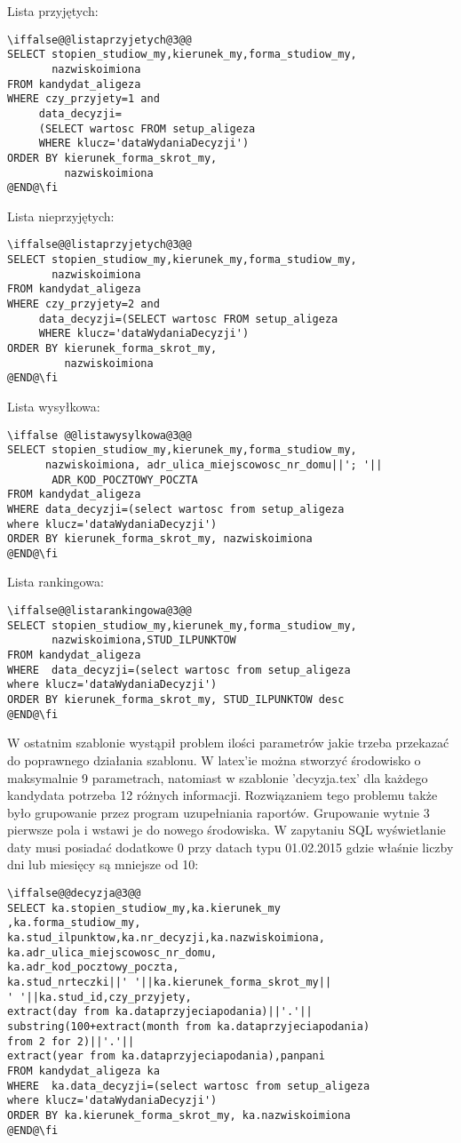 \par Lista przyjętych:
 \begin{verbatim}
\iffalse@@listaprzyjetych@3@@
SELECT stopien_studiow_my,kierunek_my,forma_studiow_my,
       nazwiskoimiona 
FROM kandydat_aligeza 
WHERE czy_przyjety=1 and
     data_decyzji=
     (SELECT wartosc FROM setup_aligeza 
     WHERE klucz='dataWydaniaDecyzji')
ORDER BY kierunek_forma_skrot_my,
         nazwiskoimiona
@END@\fi
\end{verbatim}
\par Lista nieprzyjętych:
 \begin{verbatim}
\iffalse@@listaprzyjetych@3@@
SELECT stopien_studiow_my,kierunek_my,forma_studiow_my,
       nazwiskoimiona 
FROM kandydat_aligeza 
WHERE czy_przyjety=2 and
     data_decyzji=(SELECT wartosc FROM setup_aligeza 
     WHERE klucz='dataWydaniaDecyzji')
ORDER BY kierunek_forma_skrot_my,
         nazwiskoimiona
@END@\fi
\end{verbatim}
\par Lista wysyłkowa:
 \begin{verbatim}
\iffalse @@listawysylkowa@3@@
SELECT stopien_studiow_my,kierunek_my,forma_studiow_my,
      nazwiskoimiona, adr_ulica_miejscowosc_nr_domu||'; '||
       ADR_KOD_POCZTOWY_POCZTA
FROM kandydat_aligeza 
WHERE data_decyzji=(select wartosc from setup_aligeza 
where klucz='dataWydaniaDecyzji')
ORDER BY kierunek_forma_skrot_my, nazwiskoimiona
@END@\fi
\end{verbatim}
\par Lista  rankingowa:
 \begin{verbatim}
\iffalse@@listarankingowa@3@@
SELECT stopien_studiow_my,kierunek_my,forma_studiow_my,
       nazwiskoimiona,STUD_ILPUNKTOW
FROM kandydat_aligeza
WHERE  data_decyzji=(select wartosc from setup_aligeza 
where klucz='dataWydaniaDecyzji')
ORDER BY kierunek_forma_skrot_my, STUD_ILPUNKTOW desc
@END@\fi
\end{verbatim}
\par 
W ostatnim szablonie wystąpił problem ilości parametrów jakie trzeba przekazać do poprawnego działania szablonu. W latex'ie można stworzyć środowisko o maksymalnie 9 parametrach, natomiast w szablonie 'decyzja.tex' dla każdego kandydata potrzeba 12 różnych informacji. Rozwiązaniem tego problemu także było grupowanie przez program uzupełniania raportów. Grupowanie wytnie 3 pierwsze pola i wstawi je do nowego środowiska. W zapytaniu SQL wyświetlanie daty musi posiadać dodatkowe 0 przy datach typu 01.02.2015 gdzie właśnie liczby dni lub miesięcy są mniejsze od 10:
 \begin{verbatim}
\iffalse@@decyzja@3@@
SELECT ka.stopien_studiow_my,ka.kierunek_my
,ka.forma_studiow_my,
ka.stud_ilpunktow,ka.nr_decyzji,ka.nazwiskoimiona,
ka.adr_ulica_miejscowosc_nr_domu,
ka.adr_kod_pocztowy_poczta,
ka.stud_nrteczki||' '||ka.kierunek_forma_skrot_my||
' '||ka.stud_id,czy_przyjety,
extract(day from ka.dataprzyjeciapodania)||'.'||
substring(100+extract(month from ka.dataprzyjeciapodania)
from 2 for 2)||'.'||
extract(year from ka.dataprzyjeciapodania),panpani
FROM kandydat_aligeza ka 
WHERE  ka.data_decyzji=(select wartosc from setup_aligeza 
where klucz='dataWydaniaDecyzji')
ORDER BY ka.kierunek_forma_skrot_my, ka.nazwiskoimiona
@END@\fi
\end{verbatim}
